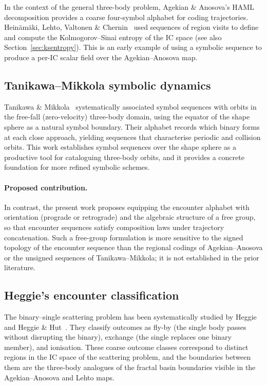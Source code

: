 \documentclass[11pt,a4paper]{article}
\begin{document}
In the context of the general three-body problem, Agekian \& Anosova's HAML decomposition
provides a coarse four-symbol alphabet for coding trajectories.  Heinäm\"{a}ki, Lehto, Valtonen
\& Chernin~\cite{chernin2000} used sequences of region visits to define and compute the
Kolmogorov--Sinai entropy of the IC space (see also Section~\ref{sec:ksentropy}).  This is
an early example of using a symbolic sequence to produce a per-IC scalar field over the
Agekian--Anosova map.

\subsection{Tanikawa--Mikkola symbolic dynamics}

Tanikawa \& Mikkola~\cite{tanikawa2015,tanikawa2000} systematically associated symbol sequences
with orbits in the free-fall (zero-velocity) three-body domain, using the equator of the shape
sphere as a natural symbol boundary.  Their alphabet records which binary forms at each close
approach, yielding sequences that characterise periodic and collision orbits.  This work
establishes symbol sequences over the shape sphere as a productive tool for cataloguing
three-body orbits, and it provides a concrete foundation for more refined symbolic schemes.

\paragraph{Proposed contribution.}
In contrast, the present work proposes equipping the encounter alphabet with orientation
(prograde or retrograde) and the algebraic structure of a free group, so that encounter
sequences satisfy composition laws under trajectory concatenation.  Such a free-group
formulation is more sensitive to the signed topology of the encounter sequence than the
regional codings of Agekian--Anosova or the unsigned sequences of Tanikawa--Mikkola; it is
not established in the prior literature.

\subsection{Heggie's encounter classification}

The binary--single scattering problem has been systematically studied by Heggie~\cite{heggie1975}
and Heggie \& Hut~\cite{heggie2003}.  They classify outcomes as fly-by (the single body passes
without disrupting the binary), exchange (the single replaces one binary member), and
ionisation.  These coarse outcome classes correspond to distinct regions in the IC space of the
scattering problem, and the boundaries between them are the three-body analogues of the fractal
basin boundaries visible in the Agekian--Anosova and Lehto maps.
\end{document}
